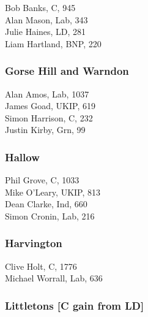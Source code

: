 \documentclass[a4paper,openany,10pt]{book}
\begin{document}


Bob Banks, C, 945\\
Alan Mason, Lab, 343\\
Julie Haines, LD, 281\\
Liam Hartland, BNP, 220\\


\subsubsection*{Gorse Hill and Warndon}



Alan Amos, Lab, 1037\\
James Goad, UKIP, 619\\
Simon Harrison, C, 232\\
Justin Kirby, Grn, 99\\


\subsubsection*{Hallow}



Phil Grove, C, 1033\\
Mike O'Leary, UKIP, 813\\
Dean Clarke, Ind, 660\\
Simon Cronin, Lab, 216\\


\subsubsection*{Harvington}



Clive Holt, C, 1776\\
Michael Worrall, Lab, 636\\


\subsubsection*{Littletons \hspace*{\fill}\nolinebreak[1]%
\enspace\hspace*{\fill}
[C gain from LD]}

\end{document}
